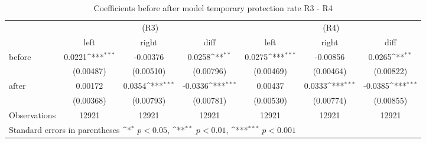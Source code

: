 \begin{table}[!ht]\centering \footnotesize
\def\sym#1{\ifmmode^{#1}\else\(^{#1}\)\fi}
\caption{Coefficients before after model temporary protection rate R3 - R4}
\begin{tabular}{l*{6}{c}}
\hline\hline
                    &\multicolumn{3}{c}{(R3)}&\multicolumn{3}{c}{(R4)}\\
&\multicolumn{1}{c}{left}&\multicolumn{1}{c}{right}&\multicolumn{1}{c}{diff}&\multicolumn{1}{c}{left}&\multicolumn{1}{c}{right}&\multicolumn{1}{c}{diff}\\
\hline
before              &      0.0221\sym{***}&    -0.00376         &      0.0258\sym{**} &      0.0275\sym{***}&    -0.00856         &      0.0265\sym{**} \\
                    &   (0.00487)         &   (0.00510)         &   (0.00796)         &   (0.00469)         &   (0.00464)         &   (0.00822)         \\
[0,5em]
after               &     0.00172         &      0.0354\sym{***}&     -0.0336\sym{***}&     0.00437         &      0.0333\sym{***}&     -0.0385\sym{***}\\
                    &   (0.00368)         &   (0.00793)         &   (0.00781)         &   (0.00530)         &   (0.00774)         &   (0.00855)         \\
\hline
Observations        &       12921         &       12921         &       12921         &       12921         &       12921         &       12921         \\
\hline\hline
\multicolumn{7}{l}{\footnotesize Standard errors in parentheses \sym{*} \(p<0.05\), \sym{**} \(p<0.01\), \sym{***} \(p<0.001\)}\\
\end{tabular}
\end{table}
